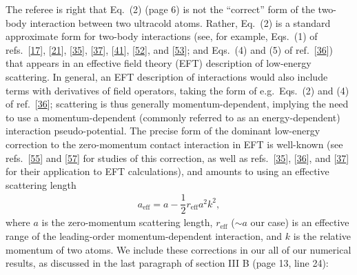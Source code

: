 \documentclass[preprint]{revtex4-1}
\renewcommand{\t}{\text} %
\newcommand{\f}{\dfrac} %
\newcommand{\1}{\mathds{1}}
\begin{document}
\begin{enumerate}
  The referee is right that Eq.~(2) (page 6) is not the ``correct''
  form of the two-body interaction between two ultracold atoms.
  Rather, Eq.~(2) is a standard approximate form for two-body
  interactions (see, for example, Eqs.~(1) of
  refs.~[\href{https://www.nature.com/articles/nphys3061}{17}],
  [\href{https://iopscience.iop.org/article/10.1088/1367-2630/11/10/103033/meta}{21}],
  [\href{https://iopscience.iop.org/article/10.1088/1367-2630/14/5/053037/meta}{35}],
  [\href{https://iopscience.iop.org/article/10.1088/1367-2630/11/9/093022/meta}{37}],
  [\href{https://www.nature.com/articles/nphys1535}{41}],
  [\href{https://journals.aps.org/pra/abstract/10.1103/PhysRevA.87.033601}{52}],
  and
  [\href{https://link.springer.com/article/10.1023\%2FA\%3A1018705520999}{53}];
  and Eqs.~(4) and (5) of
  ref.~[\href{https://journals.aps.org/pra/abstract/10.1103/PhysRevA.90.043631}{36}])
  that appears in an effective field theory (EFT) description of
  low-energy scattering.  In general, an EFT description of
  interactions would also include terms with derivatives of field
  operators, taking the form of e.g.~Eqs.~(2) and (4) of
  ref.~[\href{https://journals.aps.org/pra/abstract/10.1103/PhysRevA.90.043631}{36}];
  scattering is thus generally momentum-dependent, implying the need
  to use a momentum-dependent (commonly referred to as an
  energy-dependent) interaction pseudo-potential.  The precise form of
  the dominant low-energy correction to the zero-momentum contact
  interaction in EFT is well-known (see
  refs.~[\href{https://journals.aps.org/pra/abstract/10.1103/PhysRevA.65.043613}{55}]
  and
  [\href{https://journals.aps.org/pra/abstract/10.1103/PhysRevA.59.1998}{57}]
  for studies of this correction, as well as
  refs.~[\href{https://iopscience.iop.org/article/10.1088/1367-2630/14/5/053037/meta}{35}],
  [\href{https://journals.aps.org/pra/abstract/10.1103/PhysRevA.90.043631}{36}],
  and
  [\href{https://iopscience.iop.org/article/10.1088/1367-2630/11/9/093022/meta}{37}]
  for their application to EFT calculations), and amounts to using an
  effective scattering length
  \begin{align*}
    a_{\t{eff}} = a - \f12 r_{\t{eff}} a^2 k^2,
  \end{align*}
  where $a$ is the zero-momentum scattering length, $r_{\t{eff}}$
  ($\sim a$ our case) is an effective range of the leading-order
  momentum-dependent interaction, and $k$ is the relative momentum of
  two atoms.  We include these corrections in our all of our numerical
  results, as discussed in the last paragraph of section III B (page
  13, line 24):


\end{enumerate}
\end{document}
